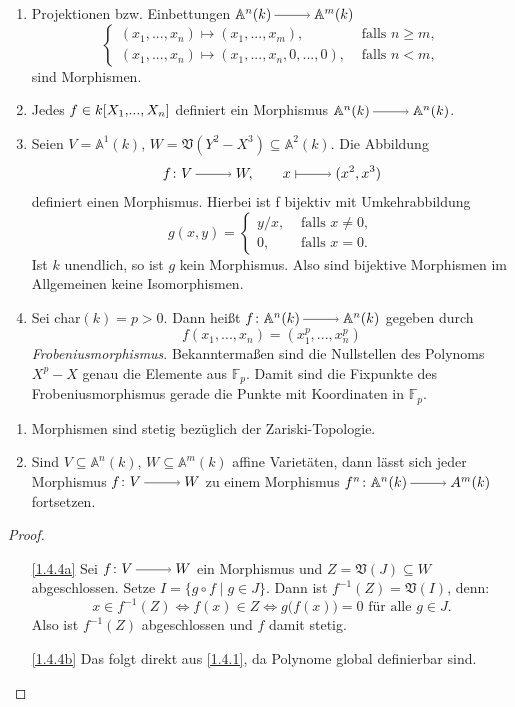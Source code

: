 \documentclass[a4paper,12pt,index=toc]{scrbook}
\theoremstyle{keinenummern} %
\def\A{\mathbb{A}}
\def\V{\mathfrak{V}}
\newcommand{\FF}{\mathbb{F}}
\renewcommand{\dotsc}{\ensuremath{\!...}}
\newcommand{\polyx}[1][n]{\ensuremath%
  [X_{1},\dotsc,X_{#1}]}
\begin{document}
\begin{bsp}\label{1.4.3}
\begin{enumerate}
\item{}  Projektionen bzw. Einbettungen $\A^{n}(k)\ra \A^{m}(k)$ 
\[\begin{cases} (x_1,\dotsc,x_n) \mapsto (x_1,\dotsc,x_m),&\text{ falls }n\ge m, \\ (x_1,\dotsc,x_n)\mapsto (x_1,\dotsc,x_n,0,\dotsc,0),&\text{ falls }n<m, \end{cases}\] sind Morphismen.
\item{} Jedes $f \in k\polyx$ definiert ein Morphismus $\A^{n}(k)\ra \A^{n}(k)$.
\item{} Seien $V=\A^1(k)$, $W=\V(Y^2-X^3) \subseteq \A^2(k)$. Die Abbildung 
\[f\colon V\ra W, \qquad x\mapsto (x^2,x^3)\]
definiert einen Morphismus.
Hierbei ist f bijektiv mit Umkehrabbildung 
\[g(x,y)=\begin{cases} y/x,&\text{ falls }x\neq 0, \\ 0,&\text{ falls }x=0. \end{cases}\]
Ist $k$ unendlich, so ist $g$ kein Morphismus. Also sind bijektive Morphismen im Allgemeinen keine Isomorphismen.
\item{} Sei char$(k)=p>0$. Dann heißt $f\colon \A^n(k)\ra \A^n(k)$ gegeben durch 
\[f(x_1,\dotsc,x_n)=(x_1^p,\dotsc,x_n^p)\] 
\emph{Frobeniusmorphismus}. Bekanntermaßen sind die Nullstellen des Polynoms $X^{p}-X$ genau die Elemente aus $\FF_p$. Damit sind die Fixpunkte des Frobeniusmorphismus gerade die Punkte mit Koordinaten in $\FF_p$.
\end{enumerate}
\end{bsp}

\begin{bem}\label{1.4.4}
\begin{enumerate}
\item{} Morphismen sind stetig bezüglich der Zariski-Topologie.
\item{} Sind $V\subseteq \A^n(k)$, $W \subseteq \A^m(k)$ affine Varietäten, dann lässt sich jeder Morphismus $f\colon V\ra W$ zu einem Morphismus $f^n\colon \A^n(k)\ra A^m(k)$ fortsetzen.
\end{enumerate}
\end{bem}

\begin{proof}
\begin{enumerate}
\item[\ref{1.4.4a}] Sei $f\colon V\ra W$ ein Morphismus und $Z=\V(J)\subseteq W$ abgeschlossen. Setze $I=\{g\circ f \mid g\in J\}$. Dann ist $f^{-1}(Z)=\V(I)$, denn: 
\[x\in f^{-1}(Z)\iff f(x)\in Z \iff g\bigl(f(x)\bigr)=0\text{ für alle }g\in J.\]
Also ist $f^{-1}(Z)$ abgeschlossen und $f$ damit stetig.
\item[\ref{1.4.4b}] Das folgt direkt aus \cref{1.4.1}, da Polynome global definierbar sind.
\end{enumerate}
\end{proof}
\end{document}
